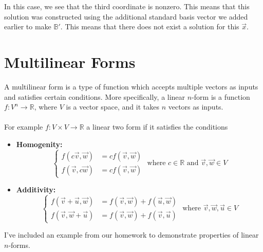 \documentclass{report}
\begin{document}
In this case,  we see that the third coordinate is nonzero.  This means that this solution was constructed using the additional standard basis vector we added earlier to make $\mathbb{B}'$.  This means that there does not exist a solution for this $\vec{x}$. 
\section{Multilinear Forms}
A multilinear form is a type of function which accepts multiple vectors as inputs and satisfies certain conditions. More specifically,  a linear $n$-form is a function $f:V^n\rightarrow\mathbb{R}$,  where $V$ is a vector space,  and it takes $n$ vectors as inputs. \\
\\
\noindent For example $f:V\times V\rightarrow\mathbb{R}$ a linear two form if it satisfies the conditions
\begin{itemize}
\item \textbf{Homogenity:}
$$
\left\{\begin{aligned}
f(c\vec{v},  \vec{w}) & = cf(\vec{v},\vec{w})\\
f(\vec{v},  c\vec{w}) & = cf(\vec{v},\vec{w})
\end{aligned}
\right.  \text{ where } c\in\mathbb{R} \text{ and } \vec{v},\vec{w}\in V
$$
\item \textbf{Additivity:}
$$
\left\{\begin{aligned}
f(\vec{v}+\vec{u}, \vec{w}) & = f(\vec{v},\vec{w})+f(\vec{u},\vec{w})\\
f(\vec{v},  \vec{w}+\vec{u}) & = f(\vec{v},\vec{w})+f(\vec{v},\vec{u})
\end{aligned}
\right.  \text{ where } \vec{v},\vec{w},\vec{u}\in V
$$
\end{itemize}
I've included an example from our homework to demonstrate properties of linear $n$-forms.
\end{document}
